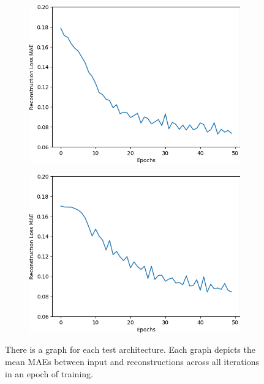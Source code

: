\begin{figure}[H]
    \centering
    \begin{subfigure}{.25\textwidth}
        \centering
        \includegraphics[width=\textwidth]
        {images/figures/experiments_architecture/mae_graphKernel5adjusted16x16x32_dim1024.png}
        \caption{}
    \end{subfigure}%
    \begin{subfigure}{.25\textwidth}
        \centering
        \includegraphics[width=\textwidth]
        {images/figures/experiments_architecture/mae_graphKernel5adjusted4x4x128_dim1024.png}
        \caption{}
    \end{subfigure}
    \caption{There is a graph for each test architecture.
    Each graph depicts the mean MAEs between input and reconstructions across all iterations in an epoch of training.}
\end{figure} \label{figure_learning_curves3}

